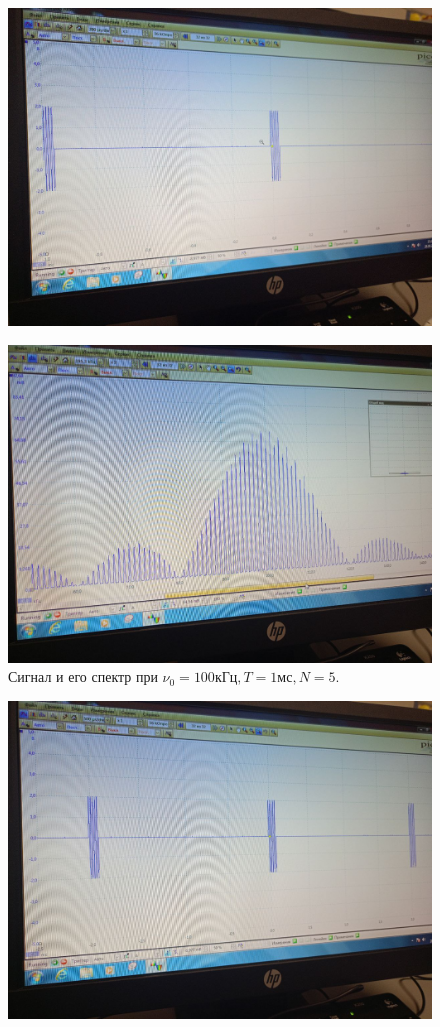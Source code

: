 \documentclass[a4paper,12pt]{article}
\begin{document}
\begin{figure}[H]
\begin{center}
    \includegraphics[width=.6\textwidth]{B.13.2.graph}
\end{center}
\end{figure}

\begin{figure}[H]
    \includegraphics[width=.9\textwidth]{B.13.2.spectr}
    \caption{Сигнал и его спектр при $\nu_{0} = 100 \text{кГц}, T = 1 \text{мс}, N = 5.$}\label{fig:foobar}
\end{figure}

\begin{figure}[H]
\begin{center}
    \includegraphics[width=.6\textwidth]{B.13.3.graph}
\end{center}
\end{figure}
\end{document}
